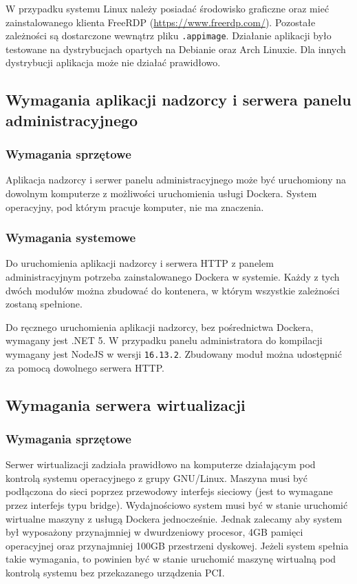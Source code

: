 \documentclass[../opis-rozwiazania.tex]{subfiles}
\begin{document}
W przypadku systemu Linux należy posiadać środowisko graficzne oraz mieć zainstalowanego klienta FreeRDP (\url{https://www.freerdp.com/}).
Pozostałe zależności są dostarczone wewnątrz pliku \texttt{.appimage}.
Działanie aplikacji było testowane na dystrybucjach opartych na Debianie oraz Arch Linuxie.
Dla innych dystrybucji aplikacja może nie działać prawidłowo.

\subsection{Wymagania aplikacji nadzorcy i serwera panelu administracyjnego}

\subsubsection{Wymagania sprzętowe}
Aplikacja nadzorcy i serwer panelu administracyjnego może być uruchomiony na dowolnym komputerze z możliwości uruchomienia usługi Dockera.
System operacyjny, pod którym pracuje komputer, nie ma znaczenia.

\subsubsection{Wymagania systemowe}
Do uruchomienia aplikacji nadzorcy i serwera HTTP z panelem administracyjnym potrzeba zainstalowanego Dockera w systemie.
Każdy z tych dwóch modułów można zbudować do kontenera, w którym wszystkie zależności zostaną spełnione.

Do ręcznego uruchomienia aplikacji nadzorcy, bez pośrednictwa Dockera, wymagany jest .NET 5. W przypadku panelu administratora do kompilacji wymagany jest NodeJS w wersji \texttt{16.13.2}. Zbudowany moduł można udostępnić za pomocą dowolnego serwera HTTP.

\subsection{Wymagania serwera wirtualizacji}
\label{system_requirements.virtsrv_rquirements}

\subsubsection{Wymagania sprzętowe}
Serwer wirtualizacji zadziała prawidłowo na komputerze działającym pod kontrolą systemu operacyjnego z grupy GNU/Linux.
Maszyna musi być podłączona do sieci poprzez przewodowy interfejs sieciowy (jest to wymagane przez interfejs typu bridge).
Wydajnościowo system musi być w stanie uruchomić wirtualne maszyny z usługą Dockera jednocześnie.
Jednak zalecamy aby system był wyposażony przynajmniej w dwurdzeniowy procesor, 4GB pamięci operacyjnej oraz przynajmniej 100GB przestrzeni dyskowej.
Jeżeli system spełnia takie wymagania, to powinien być w stanie uruchomić maszynę wirtualną pod kontrolą systemu bez przekazanego urządzenia PCI.
\end{document}
